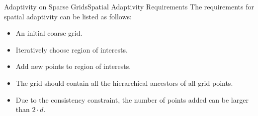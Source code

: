 \begin{frame}{Adaptivity on Sparse Grids}{Spatial Adaptivity Requirements}
    The requirements for spatial adaptivity can be listed as follows:
    \begin{itemize}[<+->]
        \item An initial coarse grid.
        \item Iteratively choose region of interests.
        \item Add new points to region of interests.
        \item The grid should contain all the hierarchical ancestors of all grid points.
        \item Due to the consistency constraint, the number of points added can be larger than \(2 \cdot d\).
    \end{itemize}
\end{frame}

